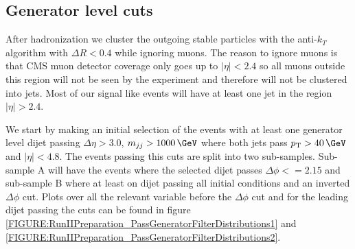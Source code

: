 \subsection{Generator level cuts}
\label{SUBSECTION:RunIIPreparation_GeneratorLevelCuts}


After hadronization we cluster the outgoing stable particles with the anti-$k_T$ algorithm with $\Delta R<0.4$ while ignoring muons. The reason to ignore muons is that \gls{CMS} muon detector coverage only goes up to $|\eta|<2.4$ so all muons outside this region will not be seen by the experiment and therefore will not be clustered into jets. Most of our signal like events will have at least one jet in the region $|\eta|>2.4$. 

We start by making an initial selection of the events with at least one generator level dijet passing $\Delta\eta > 3.0$, $m_{jj} > 1000\,\GeV$ where both jets pass $\pt > 40\,\GeV$ and $|\eta|<4.8$. The events passing this cuts are split into two sub-samples. Sub-sample A will have the events where the selected dijet passes $\Delta\phi<=2.15$ and sub-sample B where at least on dijet passing all initial conditions and an inverted $\Delta\phi$ cut. Plots over all the relevant variable before the $\Delta\phi$ cut and for the leading dijet passing the cuts can be found in figure \ref{FIGURE:RunIIPreparation_PassGeneratorFilterDistributions1} and \ref{FIGURE:RunIIPreparation_PassGeneratorFilterDistributions2}.

